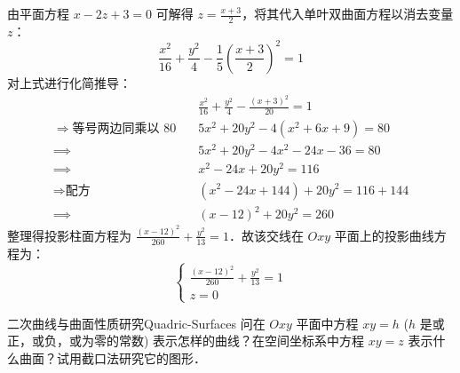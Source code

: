 \begin{solution}
    由平面方程 $x - 2z + 3 = 0$ 可解得 $z = \frac{x+3}{2}$，将其代入单叶双曲面方程以消去变量 $z$：
    \begin{equation}
        \frac{x^2}{16} + \frac{y^2}{4} - \frac{1}{5} \left( \frac{x+3}{2} \right)^2 = 1
    \end{equation}
    对上式进行化简推导：
    \begin{equation}
        \begin{aligned}
                                                      & \frac{x^2}{16} + \frac{y^2}{4} - \frac{(x+3)^2}{20} = 1 \\
            \Longrightarrow{\text{等号两边同乘以 } 80} \quad & 5x^2 + 20y^2 - 4(x^2 + 6x + 9) = 80                     \\
            \implies                                  & 5x^2 + 20y^2 - 4x^2 - 24x - 36 = 80                     \\
            \implies                                  & x^2 - 24x + 20y^2 = 116                                 \\
            \Longrightarrow{\text{配方}} \quad          & (x^2 - 24x + 144) + 20y^2 = 116 + 144                   \\
            \implies                                  & (x-12)^2 + 20y^2 = 260
        \end{aligned}
    \end{equation}
    整理得投影柱面方程为 $\frac{(x-12)^2}{260} + \frac{y^2}{13} = 1$．故该交线在 $Oxy$ 平面上的投影曲线方程为：
    \begin{equation}
        \boxed{\begin{cases} \frac{(x-12)^2}{260} + \frac{y^2}{13} = 1 \\ z = 0 \end{cases}}
    \end{equation}
\end{solution}


\begin{problem}{二次曲线与曲面性质研究}{Quadric-Surfaces}
    问在 $Oxy$ 平面中方程 $xy = h$ ($h$ 是或正，或负，或为零的常数) 表示怎样的曲线？在空间坐标系中方程 $xy = z$ 表示什么曲面？试用截口法研究它的图形．
\end{problem}

